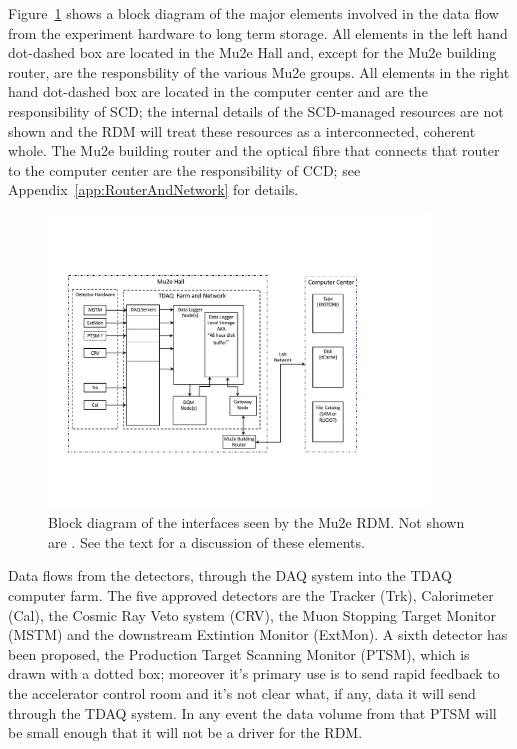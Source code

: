 Figure~\ref{fig:blockdiagram} shows a block diagram of the major elements involved
in the data flow from the experiment hardware to long term storage.
All elements in the left hand dot-dashed box are located in the Mu2e Hall
and, except for the Mu2e building router, are the responsbility of the various Mu2e groups.
All elements in the right hand dot-dashed box are located in the computer center
and are the responsibility of SCD; the internal details of the SCD-managed resources
are not shown and the RDM will treat these resources as a interconnected, coherent whole.
The Mu2e building router and the optical fibre that connects that router
to the computer center are the responsibility of CCD;
see Appendix~\ref{app:RouterAndNetwork} for details.

\begin{figure}[tbp]
\centering
\includegraphics[width=0.9\textwidth]{figures/interface_with_TDAQ.pdf}
\caption[Block diagram of interfaces seen by the Mu2e RDM]{
  Block diagram of the interfaces seen by the Mu2e RDM.
  Not shown are .  See the text for a discussion of these elements.}
\label{fig:blockdiagram}
\end{figure}

Data flows from the detectors, through the DAQ system into the TDAQ computer farm.
The five approved detectors are the Tracker (Trk), Calorimeter (Cal), the Cosmic Ray Veto system (CRV),
the Muon Stopping Target Monitor (MSTM) and the downstream Extintion Monitor (ExtMon).
A sixth detector has been proposed, the Production Target Scanning Monitor (PTSM),
which is drawn with a dotted box;
moreover it's primary use is to send rapid feedback to the accelerator control room
and it's not clear what, if any, data it will send through the TDAQ system.
In any event the data volume from that PTSM will be small enough that it will not be
a driver for the RDM.

